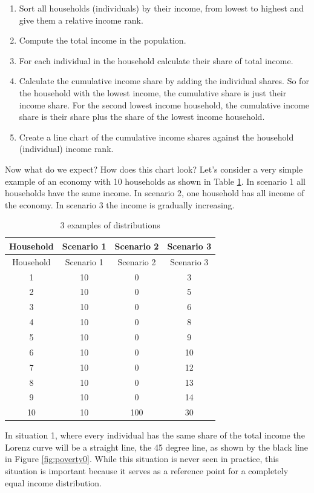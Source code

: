 \documentclass[]{book}
\begin{document}
\begin{enumerate}
\def\labelenumi{\arabic{enumi}.}
\item
  Sort all households (individuals) by their income, from lowest to highest and give them a relative income rank.
\item
  Compute the total income in the population.
\item
  For each individual in the household calculate their share of total income.
\item
  Calculate the cumulative income share by adding the individual shares. So for the household with the lowest income, the cumulative share is just their income share. For the second lowest income household, the cumulative income share is their share plus the share of the lowest income household.
\item
  Create a line chart of the cumulative income shares against the household (individual) income rank.
\end{enumerate}

Now what do we expect? How does this chart look? Let's consider a very simple example of an economy with 10 households as shown in Table \ref{tab:povt1}. In scenario 1 all households have the same income. In scenario 2, one household has all income of the economy. In scenario 3 the income is gradually increasing.

\begin{longtable}[]{@{}cccc@{}}
\caption{\label{tab:povt1} 3 examples of distributions}\tabularnewline
\toprule
Household & Scenario 1 & Scenario 2 & Scenario 3\tabularnewline
\midrule
\endfirsthead
\toprule
Household & Scenario 1 & Scenario 2 & Scenario 3\tabularnewline
\midrule
\endhead
1 & 10 & 0 & 3\tabularnewline
2 & 10 & 0 & 5\tabularnewline
3 & 10 & 0 & 6\tabularnewline
4 & 10 & 0 & 8\tabularnewline
5 & 10 & 0 & 9\tabularnewline
6 & 10 & 0 & 10\tabularnewline
7 & 10 & 0 & 12\tabularnewline
8 & 10 & 0 & 13\tabularnewline
9 & 10 & 0 & 14\tabularnewline
10 & 10 & 100 & 30\tabularnewline
\bottomrule
\end{longtable}

In situation 1, where every individual has the same share of the total income the Lorenz curve will be a straight line, the 45 degree line, as shown by the black line in Figure \ref{fig:poverty0}. While this situation is never seen in practice, this situation is important because it serves as a reference point for a completely equal income distribution.
\end{document}
